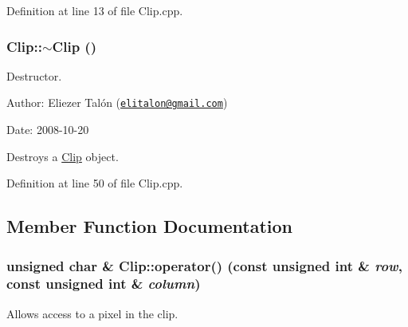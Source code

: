 Definition at line 13 of file Clip.cpp.\hypertarget{class_clip_88647ed65e3482b5e0533ec98667b0fa}{
\subsubsection[$\sim$Clip]{\setlength{\rightskip}{0pt plus 5cm}Clip::$\sim$Clip ()}}
\label{class_clip_88647ed65e3482b5e0533ec98667b0fa}


Destructor. 

\begin{Desc}
\item[Author:]Eliezer Talón (\href{mailto:elitalon@gmail.com}{\tt elitalon@gmail.com}) \end{Desc}
\begin{Desc}
\item[Date:]2008-10-20\end{Desc}
Destroys a \hyperlink{class_clip}{Clip} object. 

Definition at line 50 of file Clip.cpp.

\subsection{Member Function Documentation}
\hypertarget{class_clip_0f80c2b0f0f177fe9c780c93596f77be}{
\subsubsection[operator()]{\setlength{\rightskip}{0pt plus 5cm}unsigned char \& Clip::operator() (const unsigned int \& {\em row}, \/  const unsigned int \& {\em column})}}
\label{class_clip_0f80c2b0f0f177fe9c780c93596f77be}


Allows access to a pixel in the clip. 

